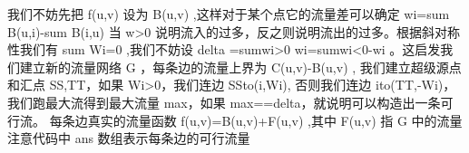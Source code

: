{}我们不妨先把\markdownRendererDollarSign{} f(u,v) \markdownRendererDollarSign{}设为\markdownRendererDollarSign{} B(u,v) \markdownRendererDollarSign{},这样对于某个点它的流量差可以确定\markdownRendererDollarSign{} w\markdownRendererUnderscore{}i=\markdownRendererBackslash{}sum B(u,i)-\markdownRendererBackslash{}sum B(i,u) \markdownRendererDollarSign{}\markdownRendererParagraphSeparator
{}当\markdownRendererDollarSign{} w>0 \markdownRendererDollarSign{}说明流入的过多，反之则说明流出的过多。根据斜对称性我们有\markdownRendererDollarSign{} \markdownRendererBackslash{}sum W\markdownRendererUnderscore{}i=0 \markdownRendererDollarSign{},我们不妨设\markdownRendererDollarSign{} \markdownRendererBackslash{}delta =\markdownRendererBackslash{}sum\markdownRendererUnderscore{}\markdownRendererLeftBrace{}wi>0\markdownRendererRightBrace{} wi=\markdownRendererBackslash{}sum\markdownRendererUnderscore{}\markdownRendererLeftBrace{}wi<0\markdownRendererRightBrace{}-wi \markdownRendererDollarSign{}。这启发我们建立新的流量网络\markdownRendererDollarSign{} G \markdownRendererDollarSign{}，每条边的流量上界为\markdownRendererDollarSign{} C(u,v)-B(u,v) \markdownRendererDollarSign{},\markdownRendererParagraphSeparator
{}我们建立超级源点和汇点 \markdownRendererDollarSign{}SS,TT\markdownRendererDollarSign{}，如果 \markdownRendererDollarSign{}W\markdownRendererUnderscore{}i>0\markdownRendererDollarSign{}，我们连边 \markdownRendererDollarSign{}SS\markdownRendererBackslash{}to(i,W\markdownRendererUnderscore{}i)\markdownRendererDollarSign{}, 否则我们连边 \markdownRendererDollarSign{}i\markdownRendererBackslash{}to(TT,-W\markdownRendererUnderscore{}i)\markdownRendererDollarSign{}，我们跑最大流得到最大流量 \markdownRendererDollarSign{}max\markdownRendererDollarSign{}，如果 \markdownRendererDollarSign{}max==\markdownRendererBackslash{}delta\markdownRendererDollarSign{}，就说明可以构造出一条可行流。\markdownRendererParagraphSeparator
{}每条边真实的流量函数\markdownRendererDollarSign{} f(u,v)=B(u,v)+F(u,v) \markdownRendererDollarSign{},其中\markdownRendererDollarSign{} F(u,v) \markdownRendererDollarSign{}指\markdownRendererDollarSign{} G \markdownRendererDollarSign{}中的流量\markdownRendererInterblockSeparator
{}\markdownRendererInterblockSeparator
{}注意代码中\markdownRendererDollarSign{} ans \markdownRendererDollarSign{}数组表示每条边的可行流量\markdownRendererInterblockSeparator
{}
\markdownRendererSectionEnd \markdownRendererSectionBegin
{}\markdownRendererInterblockSeparator
